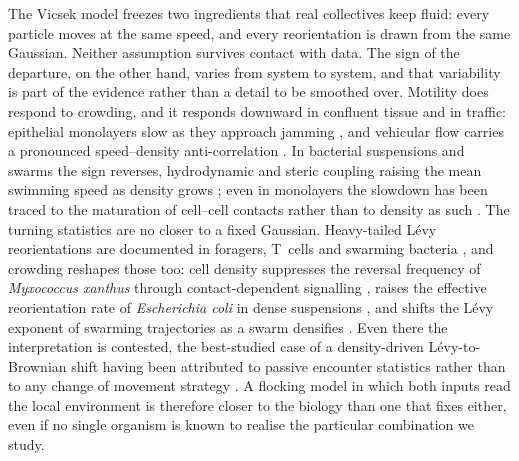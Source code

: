 \documentclass[11pt,a4paper]{article}
\begin{document}
The Vicsek model \citep{Vicsek1995} freezes two ingredients that
real collectives keep fluid: every particle moves at the same
speed, and every reorientation is drawn from the same Gaussian.
Neither assumption survives contact with data. The sign of the
departure, on the other hand, varies from system to system, and
that variability is part of the evidence rather than a detail to
be smoothed over. Motility does respond to crowding, and it
responds downward in confluent tissue and in traffic: epithelial
monolayers slow as they approach jamming
\citep{Angelini2011, Bi2016}, and vehicular flow carries a
pronounced speed--density anti-correlation \citep{Greenshields,
LWR}. In bacterial suspensions and swarms the sign reverses,
hydrodynamic and steric coupling raising the mean swimming speed
as density grows \citep{Colin2019, Beer2020}; even in monolayers
the slowdown has been traced to the maturation of cell--cell
contacts rather than to density as such \citep{Garcia2015}. The
turning statistics are no closer to a fixed Gaussian. Heavy-tailed
L\'evy reorientations are documented in foragers, T~cells and
swarming bacteria \citep{Reynolds2018, Harris2012, Ariel2015,
Zaburdaev2015}, and crowding reshapes those too: cell density
suppresses the reversal frequency of \emph{Myxococcus xanthus}
through contact-dependent signalling \citep{Shi1996}, raises the
effective reorientation rate of \emph{Escherichia coli} in dense
suspensions \citep{Colin2019}, and shifts the L\'evy exponent of
swarming trajectories as a swarm densifies \citep{Beer2020}. Even
there the interpretation is contested, the best-studied case of a
density-driven L\'evy-to-Brownian shift having been attributed to
passive encounter statistics rather than to any change of
movement strategy \citep{deJager2014}. A flocking model in which
both inputs read the local environment is therefore closer to the
biology than one that fixes either, even if no single organism is
known to realise the particular combination we study.
\end{document}
